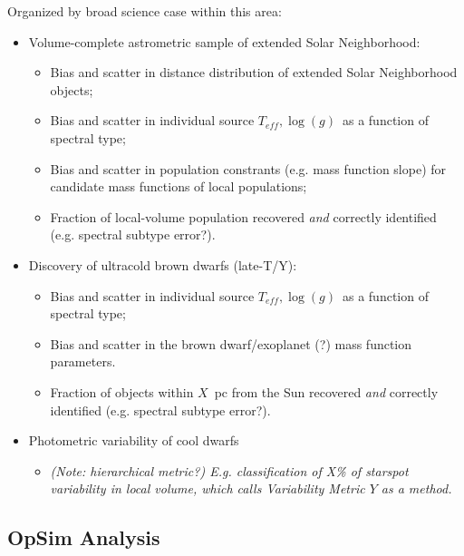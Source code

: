 Organized by broad science case within this area:
\begin{itemize}
\item Volume-complete astrometric sample of extended Solar Neighborhood:
  \begin{itemize}
  \item Bias and scatter in distance distribution of extended Solar Neighborhood objects;
  \item Bias and scatter in individual source $T_{eff}, \log(g)$~as a
    function of spectral type;
  \item Bias and scatter in population constrants (e.g. mass function slope) for candidate mass functions of local populations;
    \item Fraction of local-volume population recovered {\it and} correctly identified (e.g. spectral subtype error?).
  \end{itemize} 

\item Discovery of ultracold brown dwarfs (late-T/Y):
  \begin{itemize}
  \item Bias and scatter in individual source $T_{eff}, \log(g)$~as a
    function of spectral type;
    \item Bias and scatter in the brown dwarf/exoplanet (?) mass function parameters.
    \item Fraction of objects within $X$~pc from the Sun recovered {\it and} correctly identified (e.g. spectral subtype error?).
  \end{itemize}


\item Photometric variability of cool dwarfs
\begin{itemize}
  \item {\it (Note: hierarchical metric?) E.g. classification of X\% of starspot variability in local volume, which calls Variability Metric $Y$ as a method.}
\end{itemize}

\end{itemize}



\subsection{OpSim Analysis}
\label{sec:keyword:analysis}

